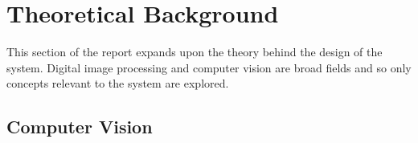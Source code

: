 \chapter{Theoretical Background}
This section of the report expands upon the theory behind the design of the system. Digital image processing and computer vision are broad fields and so only concepts relevant to the system are explored.






\section{Computer Vision}





